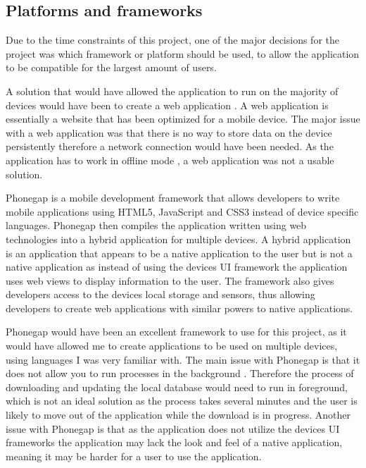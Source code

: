 \subsection{Platforms and frameworks}
Due to the time constraints of this project, one of the major decisions for the project was which framework or platform should be used, to allow the application to be compatible for the largest amount of users.

A solution that would have allowed the application to run on the majority of devices would have been to create a web application \cite{web_app}. A web application \cite{web_app} is essentially a website that has been optimized for a mobile device. The major issue with a web application was that there is no way to store data on the device persistently therefore a network connection would have been needed. As the application has to work in offline mode \cite{mobile_inter}, a web application was not a usable solution. 

Phonegap \cite{phonegap} is a mobile development framework that allows developers to write mobile applications using HTML5, JavaScript and CSS3 instead of device specific languages. Phonegap \cite{phonegap} then compiles the application written using web technologies into a hybrid application \cite{hybrid_application} for multiple devices. A hybrid application \cite{hybrid_application} is an application that appears to be a native application to the user but is not a native application as instead of using the devices UI framework the application uses web views to display information to the user. The framework also gives developers access to the devices local storage and sensors, thus allowing developers to create web applications with similar powers to native applications. 

Phonegap \cite{phonegap} would have been an excellent framework to use for this project, as it would have allowed me to create applications to be used on multiple devices, using languages I was very familiar with. The main issue with Phonegap is that it does not allow you to run processes in the background \cite{phonegap_background}. Therefore the process of downloading and updating the local database would need to run in foreground, which is not an ideal solution as the process takes several minutes and the user is likely to move out of the application while the download is in progress. Another issue with Phonegap \cite{phonegap} is that as the application does not utilize the devices UI frameworks the application may lack the look and feel of a native application, meaning it may be harder for a user to use the application.

